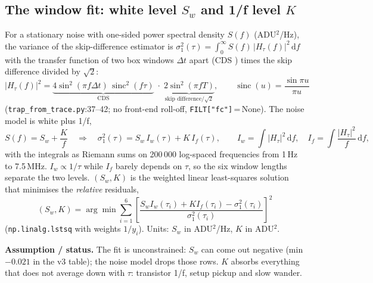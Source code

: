 \documentclass[10pt,a4paper]{article}
\newcommand{\code}[1]{\texttt{\small #1}}
\newcommand{\dd}{\,\mathrm{d}}
\newcommand{\sinc}{\operatorname{sinc}}
\newcommand{\caveat}[1]{\par\smallskip\noindent\colorbox{orange!10}{\parbox{\dimexpr\linewidth-2\fboxsep}{\small\textbf{Assumption / status.} #1}}\par\smallskip}
\begin{document}
\subsection{The window fit: white level $S_w$ and 1/f level $K$}\label{sec:windowfit}
For a stationary noise with one-sided power spectral density $S(f)$ (ADU$^2$/Hz), the variance of the skip-difference
estimator is $\sigma_1^2(\tau)=\int_0^\infty S(f)\,|H_\tau(f)|^2\dd f$ with the transfer function of two box windows
$\Delta t$ apart (CDS \cite{hopkinson1982}) times the skip difference divided by $\sqrt2$:
\begin{equation}
|H_\tau(f)|^2=\underbrace{4\sin^2(\pi f\Delta t)\,\sinc^2(f\tau)}_{\text{CDS}}\;\cdot\;\underbrace{2\sin^2(\pi fT)}_{\text{skip difference}/\sqrt2},
\qquad \sinc(u)=\frac{\sin\pi u}{\pi u}
\end{equation}
(\code{trap\_from\_trace.py}:37--42; no front-end roll-off, \code{FILT["fc"]}\,=\,None). The noise model is white plus 1/f,
\begin{equation}
S(f)=S_w+\frac{K}{f}\quad\Longrightarrow\quad
\sigma_1^2(\tau)=S_w\,I_w(\tau)+K\,I_f(\tau),\qquad I_w=\int|H_\tau|^2\dd f,\quad I_f=\int\frac{|H_\tau|^2}{f}\dd f,
\label{eq:windowfit}
\end{equation}
with the integrals as Riemann sums on 200\,000 log-spaced frequencies from 1\,Hz to 7.5\,MHz. $I_w\propto1/\tau$ while $I_f$
barely depends on $\tau$, so the six window lengths separate the two levels. $(S_w,K)$ is the weighted linear
least-squares solution that minimises the \emph{relative} residuals,
\begin{equation}
(S_w,K)=\arg\min\sum_{i=1}^{6}\left[\frac{S_wI_w(\tau_i)+KI_f(\tau_i)-\sigma_1^2(\tau_i)}{\sigma_1^2(\tau_i)}\right]^2
\end{equation}
(\code{np.linalg.lstsq} with weights $1/y_i$). Units: $S_w$ in ADU$^2$/Hz, $K$ in ADU$^2$.

\caveat{The fit is unconstrained: $S_w$ can come out negative (min $-0.021$ in the v3 table); the noise model drops those
rows. $K$ absorbs everything that does not average down with $\tau$: transistor 1/f, setup pickup and slow wander.}
\end{document}
